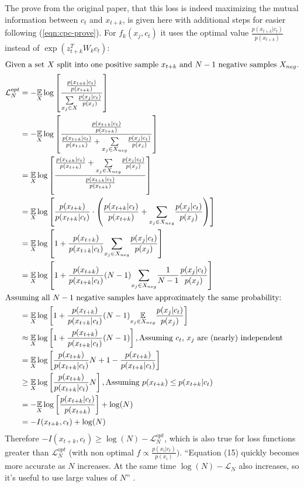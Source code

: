 The prove from the original paper, that this loss is indeed maximizing the mutual information between $c_t$ and $x_{t+k}$, is given here with additional steps for easier following (\autoref{eqn:cpc-prove}). For $f_k(x_{j}, c_t)$ it uses the optimal value $\frac{p(x_{t+k}|c_t)}{p( x_{t+k})}$ instead of $\exp \left( z_{t+k}^T W_kc_t\right)$:
\begin{align} \label{eqn:cpc-prove}
	\intertext{Given a set $X$ split into one positive sample $x_{t+k}$ and $N-1$ negative samples $X_{neg}$.}
	\mathcal{L}^{opt}_N &=-\underset{X}{\operatorname{\mathbb{E}}}\log\left[\frac{\frac{p( x_{t+k}|c_t)}{p( x_{t+k})}}{\underset{x_j\in X}{\sum}\frac{p(x_j|c_t)}{p(x_j)}}\right]\\	
	&=-\underset{X}{\operatorname{\mathbb{E}}}\log\left[\frac{\frac{p( x_{t+k}|c_t)}{p( x_{t+k})}}{\frac{p( x_{t+k}|c_t)}{p( x_{t+k})} + \underset{x_j\in X_{neg}}{\sum}\frac{p(x_j|c_t)}{p(x_j)}}\right]\\
	&=\underset{X}{\operatorname{\mathbb{E}}}\log\left[\frac{\frac{p( x_{t+k}|c_t)}{p( x_{t+k})} + \underset{x_j\in X_{neg}}{\sum}\frac{p(x_j|c_t)}{p(x_j)}}{\frac{p( x_{t+k}|c_t)}{p( x_{t+k})}}\right]\\
	&=\underset{X}{\operatorname{\mathbb{E}}}\log\left[\frac{p( x_{t+k})}{p( x_{t+k}|c_t)} \cdot \left(\frac{p( x_{t+k}|c_t)}{p( x_{t+k})} + \underset{x_j\in X_{neg}}{\sum}\frac{p(x_j|c_t)}{p(x_j)}\right)\right]\\
	&=\underset{X}{\operatorname{\mathbb{E}}}\log\left[1 + \frac{p( x_{t+k})}{p( x_{t+k}|c_t)}\underset{x_j\in X_{neg}}{\sum}\frac{p(x_j|c_t)}{p(x_j)}\right]\\
	&=\underset{X}{\operatorname{\mathbb{E}}}\log\left[1 + \frac{p( x_{t+k})}{p( x_{t+k}|c_t)}(N-1)\underset{x_j\in X_{neg}}{\sum}\frac{1}{N-1}\frac{p(x_j|c_t)}{p(x_j)}\right]\\
	\intertext{Assuming all $N-1$ negative samples have approximately the same probability:}
	&=\underset{X}{\operatorname{\mathbb{E}}}\log\left[1 + \frac{p( x_{t+k})}{p( x_{t+k}|c_t)}(N-1)\underset{x_j\in X_{neg}}{\operatorname{\mathbb{E}}}\frac{p(x_j|c_t)}{p(x_j)}\right]\\
	&\approx\underset{X}{\operatorname{\mathbb{E}}}\log\left[1 + \frac{p( x_{t+k})}{p( x_{t+k}|c_t)}(N-1)\right], \text{Assuming $c_t$, $x_j$ are (nearly) independent} \\
	&=\underset{X}{\operatorname{\mathbb{E}}}\log\left[\frac{p( x_{t+k})}{p( x_{t+k}|c_t)}N + 1 - \frac{p( x_{t+k})}{p( x_{t+k}|c_t)}\right]\\
	&\geq\underset{X}{\operatorname{\mathbb{E}}}\log\left[\frac{p( x_{t+k})}{p( x_{t+k}|c_t)}N\right], \text{Assuming $p( x_{t+k}) \leq p( x_{t+k}|c_t)$}\\
	&=-\underset{X}{\operatorname{\mathbb{E}}}\log\left[\frac{p( x_{t+k}|c_t)}{p( x_{t+k})}\right]+\log(N)\\
	&=-I(x_{t+k}, c_t) + \log(N)
\end{align}
Therefore $-I(x_{t+k}, c_t) \geq \log(N) - \mathcal{L}^{opt}_N$, which is also true for loss functions greater than $\mathcal{L}^{opt}_N$ (with non optimal $f \propto \frac{p(x_i|c_t)}{p(x_i)})$. \enquote{Equation (15) quickly becomes more accurate as $N$ increases. At the same time $\log(N)-\mathcal{L}_N$ also increases, so it's useful to use large values of $N$} \autocite{DBLP:journals/corr/abs-1807-03748}.

